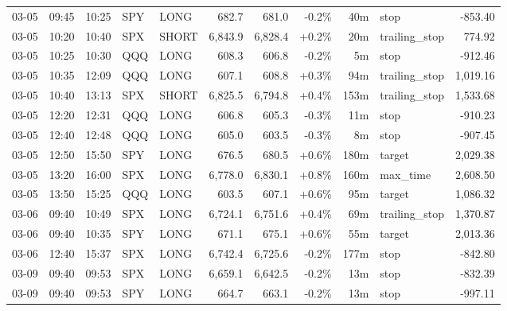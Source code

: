 \documentclass[11pt,a4paper,twoside]{article}
\begin{document}
\begin{center}
\begin{longtable}{>{\color{txtmain}}l l l l l r r r r >{\color{txtmain}}l r}
03-05 & 09:45 & 10:25 & SPY & LONG & 682.7 & 681.0 & \textcolor{lossred}{-0.2\%} & 40m & stop & \textcolor{lossred}{-853.40} \\
03-05 & 10:20 & 10:40 & SPX & SHORT & 6,843.9 & 6,828.4 & \textcolor{wingreen}{+0.2\%} & 20m & trailing\_stop & \textcolor{wingreen}{774.92} \\
03-05 & 10:25 & 10:30 & QQQ & LONG & 608.3 & 606.8 & \textcolor{lossred}{-0.2\%} & 5m & stop & \textcolor{lossred}{-912.46} \\
03-05 & 10:35 & 12:09 & QQQ & LONG & 607.1 & 608.8 & \textcolor{wingreen}{+0.3\%} & 94m & trailing\_stop & \textcolor{wingreen}{1,019.16} \\
03-05 & 10:40 & 13:13 & SPX & SHORT & 6,825.5 & 6,794.8 & \textcolor{wingreen}{+0.4\%} & 153m & trailing\_stop & \textcolor{wingreen}{1,533.68} \\
03-05 & 12:20 & 12:31 & QQQ & LONG & 606.8 & 605.3 & \textcolor{lossred}{-0.3\%} & 11m & stop & \textcolor{lossred}{-910.23} \\
03-05 & 12:40 & 12:48 & QQQ & LONG & 605.0 & 603.5 & \textcolor{lossred}{-0.3\%} & 8m & stop & \textcolor{lossred}{-907.45} \\
03-05 & 12:50 & 15:50 & SPY & LONG & 676.5 & 680.5 & \textcolor{wingreen}{+0.6\%} & 180m & target & \textcolor{wingreen}{2,029.38} \\
03-05 & 13:20 & 16:00 & SPX & LONG & 6,778.0 & 6,830.1 & \textcolor{wingreen}{+0.8\%} & 160m & max\_time & \textcolor{wingreen}{2,608.50} \\
03-05 & 13:50 & 15:25 & QQQ & LONG & 603.5 & 607.1 & \textcolor{wingreen}{+0.6\%} & 95m & target & \textcolor{wingreen}{1,086.32} \\
03-06 & 09:40 & 10:49 & SPX & LONG & 6,724.1 & 6,751.6 & \textcolor{wingreen}{+0.4\%} & 69m & trailing\_stop & \textcolor{wingreen}{1,370.87} \\
03-06 & 09:40 & 10:35 & SPY & LONG & 671.1 & 675.1 & \textcolor{wingreen}{+0.6\%} & 55m & target & \textcolor{wingreen}{2,013.36} \\
03-06 & 12:40 & 15:37 & SPX & LONG & 6,742.4 & 6,725.6 & \textcolor{lossred}{-0.2\%} & 177m & stop & \textcolor{lossred}{-842.80} \\
03-09 & 09:40 & 09:53 & SPX & LONG & 6,659.1 & 6,642.5 & \textcolor{lossred}{-0.2\%} & 13m & stop & \textcolor{lossred}{-832.39} \\
03-09 & 09:40 & 09:53 & SPY & LONG & 664.7 & 663.1 & \textcolor{lossred}{-0.2\%} & 13m & stop & \textcolor{lossred}{-997.11} \\

\end{longtable}
\end{center}
\end{document}
